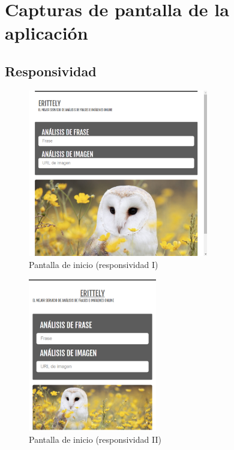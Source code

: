\documentclass[a4paper]{article}
\begin{document}
\newpage
\clearpage
\section{Capturas de pantalla de la aplicación} %
\label{sec:capturas_de_pantalla_de_la_aplicación}
\subsection{Responsividad} %
\label{sub:responsividad}

\begin{figure}[htp!]
    \centering
    \caption{Pantalla de inicio (responsividad I)}
    \label{fig:1}
    \includegraphics[width=0.7\textwidth]{1}
\end{figure}
\begin{figure}[htp!]
    \centering
    \caption{Pantalla de inicio (responsividad II)}
    \label{fig:2}
    \includegraphics[width=0.5\textwidth]{2}
\end{figure}
\end{document}

